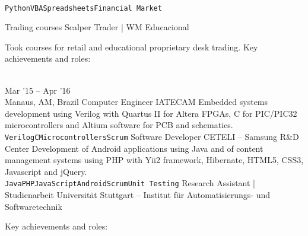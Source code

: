 \documentclass[10pt]{developercv} %
\begin{document}
\begin{entrylist}
{    \begin{contributionlist}
    \end{contributionlist}\\
    \texttt{Python}\slashsep\texttt{VBA}\slashsep\texttt{Spreadsheets}\slashsep\texttt{Financial Market}}
  {Trading courses}
  {Scalper Trader | WM Educacional}
  {
    Took courses for retail and educational proprietary desk trading. Key achievements and roles:\\
    \begin{contributionlist}
    \end{contributionlist}}\\
  \entry
  {Mar '15 -- Apr '16\\\footnotesize{Manaus, AM, Brazil}}
  {Computer Engineer}
  {IATECAM}
  {
    Embedded systems development using Verilog with Quartus II for Altera FPGAs, C for PIC/PIC32 microcontrollers and Altium software for PCB and schematics.\\
    \texttt{Verilog}\slashsep\texttt{C}\slashsep\texttt{Microcontrollers}\slashsep\texttt{Scrum}}
  {Software Developer}
  {CETELI -- Samsung R\&D Center}
  {
    Development of Android applications using Java and of content management systems using PHP with Yii2 framework, Hibernate, HTML5, CSS3, Javascript and jQuery.\\
    \texttt{Java}\slashsep\texttt{PHP}\slashsep\texttt{JavaScript}\slashsep\texttt{Android}\slashsep\texttt{Scrum}\slashsep\texttt{Unit Testing}}
  {Research Assistant | Studienarbeit}
  {Universität Stuttgart – Institut für Automatisierungs- und Softwaretechnik}
  {
    Key achievements and roles:\\
    \begin{contributionlist}

\end{contributionlist}}
\end{entrylist}
\end{document}
